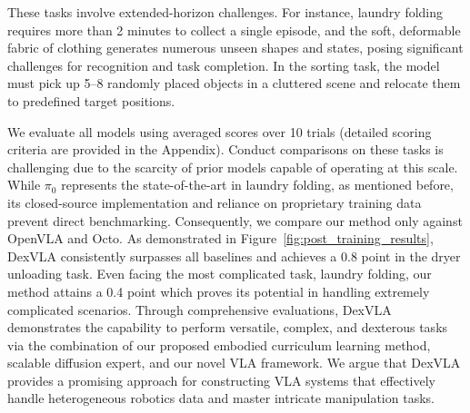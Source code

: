 These tasks involve extended-horizon challenges. For instance, laundry folding requires more than 2 minutes to collect a single episode, and the soft, deformable fabric of clothing generates numerous unseen shapes and states, posing significant challenges for recognition and task completion. In the sorting task, the model must pick up 5–8 randomly placed objects in a cluttered scene and relocate them to predefined target positions.


We evaluate all models using averaged scores over 10 trials (detailed scoring criteria are provided in the Appendix). Conduct comparisons on these tasks is challenging due to the scarcity of prior models capable of operating at this scale. While $\pi_0$ represents the state-of-the-art in laundry folding, as mentioned before, its closed-source implementation and reliance on proprietary training data prevent direct benchmarking. Consequently, we compare our method only against OpenVLA and Octo. As demonstrated in Figure~\ref{fig:post_training_results}, DexVLA consistently surpasses all baselines and achieves a 0.8 point in the dryer unloading task. Even facing the most complicated task, laundry folding, our method attains a 0.4 point which proves its potential in handling extremely complicated scenarios. Through comprehensive evaluations, DexVLA demonstrates the capability to perform versatile, complex, and dexterous tasks via the combination of our proposed embodied curriculum learning method, scalable diffusion expert, and our novel VLA framework. We argue that DexVLA provides a promising approach for constructing VLA systems that effectively handle heterogeneous robotics data and master intricate manipulation tasks.
